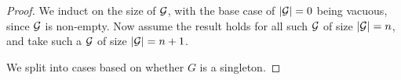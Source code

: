 \begin{proof}
\leanok
We induct on the size of $\mathcal{G}$, with the base case of $|\mathcal{G}| = 0$ being vacuous, since $\mathcal{G}$ is non-empty. Now assume the result holds for all such $\mathcal{G}$ of size $|\mathcal{G}| = n$, and take such a $\mathcal{G}$ of size $|\mathcal{G}| = n+1$. 

\vs

We split into cases based on whether $G$ is a singleton.
\end{proof}





    
